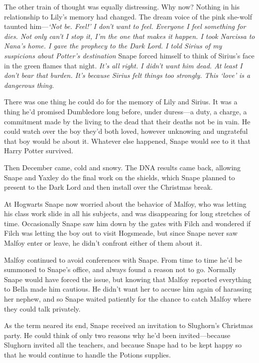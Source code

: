 The other train of thought was equally distressing. Why now? Nothing in his relationship to Lily's memory had changed. The dream voice of the pink she-wolf taunted him—\emph{`Not be. Feel!' I don't want to feel. Everyone I feel something for dies. Not only can't I stop it, I'm the one that makes it happen. I took Narcissa to Nana's home. I gave the prophecy to the Dark Lord. I told Sirius of my suspicions about Potter's destination{\el}} Snape forced himself to think of Sirius's face in the green flames that night. \emph{It's all right. I didn't want him dead. At least I don't bear that burden. It's because Sirius felt things too strongly. This `love' is a dangerous thing.}

There was one thing he could do for the memory of Lily and Sirius. It was a thing he'd promised Dumbledore long before, under duress—a duty, a charge, a commitment made by the living to the dead that their deaths not be in vain. He could watch over the boy they'd both loved, however unknowing and ungrateful that boy would be about it. Whatever else happened, Snape would see to it that Harry Potter survived.

Then December came, cold and snowy. The DNA results came back, allowing Snape and Yaxley do the final work on the shields, which Snape planned to present to the Dark Lord and then install over the Christmas break.

At Hogwarts Snape now worried about the behavior of Malfoy, who was letting his class work slide in all his subjects, and was disappearing for long stretches of time. Occasionally Snape saw him down by the gates with Filch and wondered if Filch was letting the boy out to visit Hogsmeade, but since Snape never saw Malfoy enter or leave, he didn't confront either of them about it.

Malfoy continued to avoid conferences with Snape. From time to time he'd be summoned to Snape's office, and always found a reason not to go. Normally Snape would have forced the issue, but knowing that Malfoy reported everything to Bella made him cautious. He didn't want her to accuse him again of harassing her nephew, and so Snape waited patiently for the chance to catch Malfoy where they could talk privately.

As the term neared its end, Snape received an invitation to Slughorn's Christmas party. He could think of only two reasons why he'd been invited—because Slughorn invited all the teachers, and because Snape had to be kept happy so that he would continue to handle the Potions supplies.

